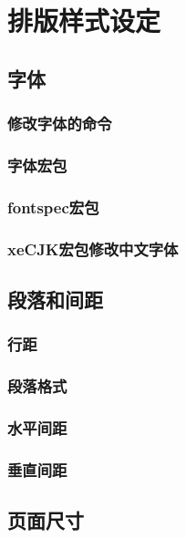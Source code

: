 \chapter{排版样式设定}

\section{字体}

\subsection{修改字体的命令}

\subsection{字体宏包}

\subsection{\textsf{fontspec}宏包}

\subsection{\textsf{xeCJK}宏包修改中文字体}

\section{段落和间距}

\subsection{行距}

\subsection{段落格式}

\subsection{水平间距}

\subsection{垂直间距}

\section{页面尺寸}

